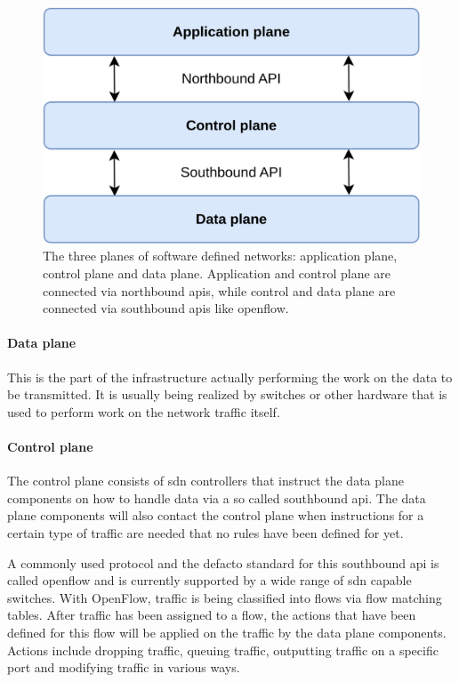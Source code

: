 \begin{figure}[h]
    \centering
    \includegraphics[width=\linewidth]{images/chapter_2/sdn.png}
    \caption[Software defined networking (\acrshort{sdn})]{The three planes of software defined networks: application plane, control plane and data plane. Application and control plane are connected via northbound \acrshort{api}s, while control and data plane are connected via southbound \acrshort{api}s like \Gls{openflow}.}
    \label{fig:sdn}
\end{figure}

\paragraph{Data plane} This is the part of the infrastructure actually performing the work on the data to be transmitted. It is usually being realized by switches or other hardware that is used to perform work on the network traffic itself.

\paragraph{Control plane} The control plane consists of \acrshort{sdn} controllers that instruct the data plane components on how to handle data via a so called southbound \acrshort{api}. The data plane components will also contact the control plane when instructions for a certain type of traffic are needed that no rules have been defined for yet.

A commonly used protocol and the defacto standard for this southbound \acrshort{api} is called \Gls{openflow} \cite{openflow} and is currently supported by a wide range of \acrshort{sdn} capable switches. With OpenFlow, traffic is being classified into flows via flow matching tables. After traffic has been assigned to a flow, the actions that have been defined for this flow will be applied on the traffic by the data plane components. Actions include dropping traffic, queuing traffic, outputting traffic on a specific port and modifying traffic in various ways.

